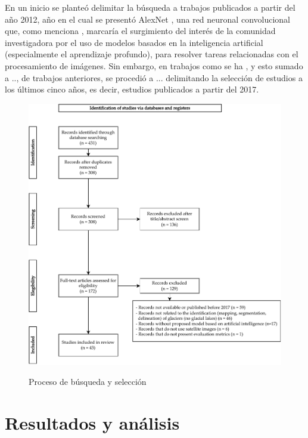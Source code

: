 \documentclass{article}
\begin{document}
En un inicio se planteó delimitar la búsqueda a trabajos publicados a partir del año 2012, año en el cual se presentó AlexNet \cite{krizhevsky2012imagenet}, una red neuronal convolucional que, como menciona \cite{hoeser2020object}, marcaría el surgimiento del interés de la comunidad investigadora por el uso de modelos basados en la inteligencia artificial (especialmente el aprendizaje profundo), para resolver tareas relacionadas con el procesamiento de imágenes. Sin embargo, en trabajos como \cite{ma2019deep} se ha , y esto sumado a .., de trabajos anteriores, se procedió a  ... delimitando la selección de estudios a los últimos cinco años, es decir, estudios publicados a partir del 2017.

\begin{figure}[H]
    \centering
    \includegraphics[width=1\textwidth]{images/prisma.pdf}
    \label{fig:prisma}
    \caption{Proceso de búsqueda y selección}
\end{figure}


\section{Resultados y análisis}
\end{document}
